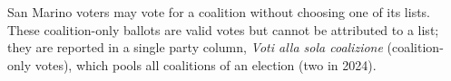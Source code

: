 San Marino voters may vote for a coalition without choosing one of its lists.
These coalition-only ballots are valid votes but cannot be attributed to a
list; they are reported in a single party column, \textit{Voti alla sola
coalizione} (coalition-only votes), which pools all coalitions of an election
(two in 2024).

